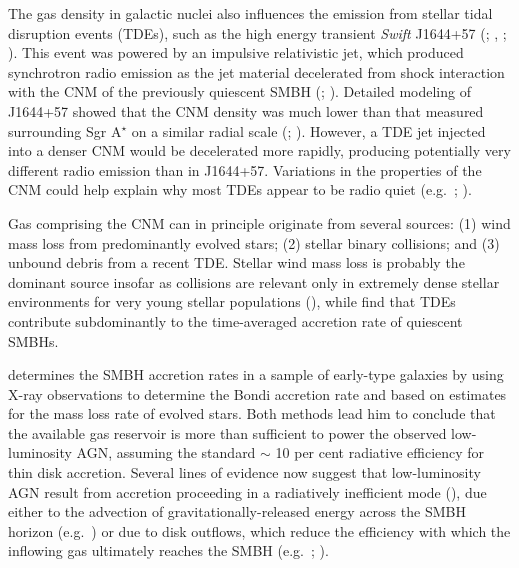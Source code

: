 \documentclass[usenatbib,fleqn]{mn2e}
\newcommand{\Mbh}[1][]{M_{\bullet#1}}
\begin{document}

The gas density in galactic nuclei also influences the emission from
stellar tidal disruption events (TDEs), such as the high energy
transient {\it Swift} J1644+57 (\citealt{Levan+11};
\citealt{Bloom+11}, \citealt{Burrows+11}; \citealt{Zauderer+11}).
This event was powered by an impulsive relativistic jet, which
produced synchrotron radio emission as the jet material decelerated
from shock interaction with the CNM of the previously quiescent SMBH
(\citealt{Giannios&Metzger11}; \citealt{Zauderer+11}).  Detailed
modeling of J1644+57 showed that the CNM density was much lower than
that measured surrounding Sgr A$^{\star}$ on a similar radial scale
(\citealt{Metzger+12}; \citealt{BergerZauderer+:2012a}).  However, a
TDE jet injected into a denser CNM would be decelerated more rapidly,
producing potentially very different radio emission than in J1644+57.
Variations in the properties of the CNM could help explain why most
TDEs appear to be radio quiet (e.g.~\citealt{Bower+13};
\citealt{VanVelzen+13}).

Gas comprising the CNM can in principle originate from several
sources: (1) wind mass loss from predominantly evolved stars; (2)
stellar binary collisions; and (3) unbound debris from a recent TDE.
Stellar wind mass loss is probably the dominant source insofar as
collisions are relevant only in extremely dense stellar environments
for very young stellar populations (\citealt{Rubin&Loeb11}), while
\citet{MacLeod+13} find that TDEs contribute subdominantly to the
time-averaged accretion rate of quiescent SMBHs.

\citet{Ho:2009a} determines the SMBH accretion rates in a sample of
early-type galaxies by using X-ray observations to determine the
Bondi accretion rate and based on estimates for the mass loss rate of
evolved stars.  Both methods lead him to conclude that the available
gas reservoir is more than sufficient to power the observed
low-luminosity AGN, assuming the standard $\sim$ 10 per cent radiative
efficiency for thin disk accretion.  Several lines of evidence now suggest that low-luminosity AGN result from accretion
proceeding in a radiatively inefficient mode
(\citealt{Yuan&Narayan14}), due either to the advection of
gravitationally-released energy across the SMBH horizon
(e.g.~\citealt{Narayan&Yi95}) or due to disk outflows, which reduce the efficiency with which the inflowing gas ultimately reaches the SMBH (e.g.~\citealt{Blandford&Begelman99}; \citealt{Li+13}).
\end{document}
